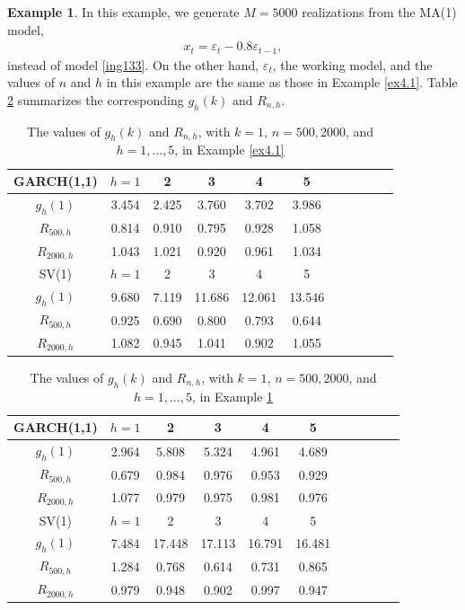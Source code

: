 \documentclass[ejsv2]{imsart}
\theoremstyle{plain}
\theoremstyle{definition}
\newtheorem{example}{Example}[section]
\theoremstyle{remark}
\begin{document}
\begin{example}\label{ex4.2}
In this example,
we generate $M=5000$ realizations from
the MA(1) model,
\begin{eqnarray}
\label{ing134}
x_t=\varepsilon_t-0.8\varepsilon_{t-1},
\end{eqnarray}
instead of model \eqref{ing133}.
On the other hand, $\varepsilon_t$, the working model,
and the values of $n$ and $h$ in this example are the same as those in Example \ref{ex4.1}.
Table \ref{tab2} summarizes the corresponding  $g_{h}(k)$
and $R_{n,h}$.
\end{example}

\begin{table}
\caption{The values of $g_{h}(k)$ and $R_{n,h}$, with $k=1$, $n=500, 2000$, and $h=1,\ldots, 5$, in Example \ref{ex4.1}}
\label{tab1}
\centering
\begin{tabular}{ccccccccccc} \hline
    GARCH(1,1) & $h=1$ & 2 & 3 & 4 & 5 \\ \hline
    $g_{h}(1)$ & 3.454 & 2.425 & 3.760 & 3.702 & 3.986 \\ \hline
   $R_{500,h}$ & 0.814 & 0.910 & 0.795 & 0.928 & 1.058 \\
   $R_{2000,h}$ & 1.043 & 1.021 & 0.920 & 0.961 & 1.034 \\ \hline \hline
   SV(1) & $h=1$ & 2 & 3 & 4 & 5 \\ \hline
    $g_{h}(1)$ & 9.680 & 7.119 & 11.686 & 12.061 & 13.546 \\ \hline
   $R_{500,h}$ & 0.925 & 0.690 & 0.800 & 0.793 & 0.644 \\
   $R_{2000,h}$ & 1.082 & 0.945 & 1.041 & 0.902 & 1.055 \\ \hline
  \end{tabular}
\end{table}

\begin{table}
\caption{The values of $g_{h}(k)$ and $R_{n,h}$, with $k=1$, $n=500, 2000$, and $h=1,\ldots, 5$, in Example \ref{ex4.2}}
\label{tab2}
\centering
\begin{tabular}{ccccccccccc} \hline
    GARCH(1,1) & $h=1$ & 2 & 3 & 4 & 5 \\ \hline
    $g_{h}(1)$ & 2.964 & 5.808 & 5.324 & 4.961 & 4.689 \\ \hline
   $R_{500,h}$ & 0.679 & 0.984 & 0.976 & 0.953 & 0.929 \\
   $R_{2000,h}$ & 1.077 & 0.979 & 0.975 & 0.981 & 0.976 \\ \hline \hline
   SV(1) & $h=1$ & 2 & 3 & 4 & 5 \\ \hline
    $g_{h}(1)$ & 7.484 & 17.448 & 17.113 & 16.791 & 16.481 \\ \hline
   $R_{500,h}$ & 1.284 & 0.768 & 0.614 & 0.731 & 0.865 \\
   $R_{2000,h}$ & 0.979 & 0.948 & 0.902 & 0.997 & 0.947 \\ \hline
  \end{tabular}
\end{table}
\end{document}
